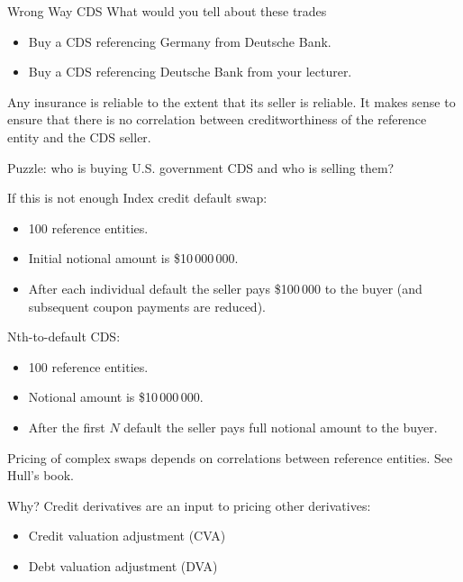 \documentclass{beamer}
\begin{document}
\begin{frame}{Wrong Way CDS}
\justify
What would you tell about these trades
\begin{itemize}
\item Buy a CDS referencing Germany from Deutsche Bank.
\item Buy a CDS referencing Deutsche Bank from your lecturer.
\end{itemize}

\justify
Any insurance is reliable to the extent that its seller is reliable. It makes sense to ensure that there is no correlation between creditworthiness of the reference entity and the CDS seller.

\justify
Puzzle: who is buying U.S. government CDS and who is selling them?
\end{frame}



\begin{frame}{If this is not enough}
\justify
Index credit default swap:
\begin{itemize}
\item 100 reference entities.
\item Initial notional amount is \$10\,000\,000.
\item After each individual default the seller pays \$100\,000 to the buyer (and subsequent coupon payments are reduced).
\end{itemize}

Nth-to-default CDS:
\begin{itemize}
\item 100 reference entities.
\item Notional amount is \$10\,000\,000.
\item After the first $N$ default the seller pays full notional amount to the buyer.
\end{itemize}
\justify
Pricing of complex swaps depends on correlations between reference entities. See Hull's book.
\end{frame}



\begin{frame}{Why?}
\justify
Credit derivatives are an input to pricing other derivatives:
\begin{itemize}
\item Credit valuation adjustment (CVA)
\item Debt valuation adjustment (DVA)
\end{itemize}
\end{frame}
\end{document}

